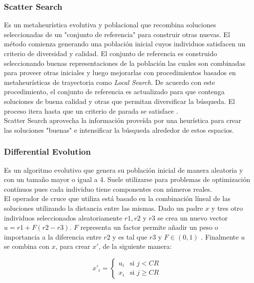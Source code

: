 \documentclass{ci5652}
\begin{document}
\subsubsection{Scatter Search}

Es un metaheurística evolutiva y poblacional que recombina soluciones 
seleccionadas de un "conjunto de referencia" para construir otras nuevas. El
método comienza generando una población inicial cuyos individuos satisfacen un
criterio de diversidad y calidad. El conjunto de referencia es construido
seleccionando buenas representaciones de la población las cuales son combinadas
para proveer otras iniciales y luego mejorarlas con procedimientos basados en
metaheurísticas de trayectoria como \textit{Local Search}. De acuerdo con este
procedimiento, el conjunto de referencia es actualizado para que contenga
soluciones de buena calidad y otras que permitan diversificar la búsqueda. El
proceso itera hasta que un criterio de parada se satisface \cite{Talbi_2009}.\\

Scatter Search aprovecha la información proveída por una heurística para crear
las soluciones "buenas" e intensificar la búsqueda alrededor de estos espacios. 


\subsubsection{Differential Evolution}

Es un algoritmo evolutivo que genera su población inicial de manera aleatoria y
con un tamaño mayor o igual a 4. Suele utilizarse para problemas de optimización
contínuos pues cada individuo tiene componentes con números reales.\\ 

El operador de cruce que utiliza está basado en la combinación líneal de las
soluciones utilizando la distancia entre las mismas. Dado un padre $x$ y tres
otro individuos seleccionados aleatoriamente $r1, r2$ y $r3$ se crea un nuevo
vector $u = r1 + F(r2 - r3)$. $F$ representa un factor permite añadir un peso o
importancia a la diferencia entre $r2$ y es tal que $r3$ y $F \in (0, 1)$
\cite{Glover_2003}. Finalmente $u$ se combina con $x$, para crear $x'$, de la
siguiente manera: 

\[
x'_i = 
  \begin{cases}
    u_i & \text{si } j < CR\\
    x_i & \text{si } j \geq CR 
  \end{cases} 
\]
\end{document}

